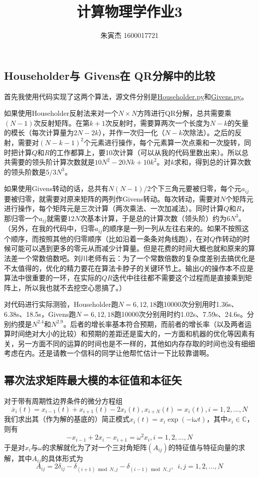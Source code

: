 \documentclass[UTF8,size=9.5]{ctexart}
\title{计算物理学作业3}
\author{朱寅杰 1600017721}
\date{}
\begin{document}
\maketitle
\setcounter{section}{3}
\subsection{Householder与 Givens在 QR分解中的比较}
首先我使用代码实现了这两个算法，源文件分别是\href{./Householder.py}{Householder.py}和\href{./Givens.py}{Givens.py}。

如果使用Householder反射法来对一个$N\times N$方阵进行QR分解，总共需要乘$(N-1)$次反射矩阵。在第$k+1$次反射时，需要算两次一个长度为$N-k$的矢量的模长（每次计算量为$2N-2k$），并作一次归一化（$N-k$次除法）。之后的反射，需要对$(N-k-1)^2$个元素进行操作，每个元素算一次点乘和一次旋转，同时把计算$Q$和$R$的工作都算上，要10次计算（可以从我的代码里数出来）。所以总共需要的领头阶计算次数就是$10N^2-20Nk+10k^2$。对$k$求和，得到总的计算次数的领头阶数是$5/3N^3$。

如果使用Givens转动的话，总共有$N(N-1)/2$个下三角元要被归零，每个元$a_{ij}$要被归零，就需要对原来矩阵的两列作Givens转动。每次转动，需要对$N$个矩阵元进行操作，每个矩阵元是三次计算（两次乘法、一次加减法）。同时计算$Q$和$R$，那归零一个$a_{ij}$就需要$12N$次基本计算，于是总的计算次数（领头阶）约为$6N^3$。（另外，在我的代码中，归零$a_{ij}$的顺序是一列一列从左往右来的。如果不按照这个顺序，而按照其他的归零顺序（比如沿着一条条对角线跑），在对$Q$作转动的时候可能可以遇到更多的零元从而减少计算量。但是花费的时间大概也就和原来的算法差一个常数倍数吧。刘川老师有云：为了一个常数倍数的复杂度差别去搞优化是不太值得的，优化的精力要花在算法卡脖子的关键环节上。输出$Q$的操作本不应是算法中很重要的一环，在实际的$QR$迭代中往往都不需要这个过程而是直接乘到矩阵上，所以我也就不去挖空心思搞了。）

对代码进行实际测验，Householder跑$N=6,12,18$跑10000次分别用时1.36s、6.38s、18.5s，Givens跑$N=6,12,18$跑10000次分别用时约1.02s、7.59s、24.6s。分别约摸是$N^{2.4}$和$N^{2.9}$。后者的增长率基本符合预期，而前者的增长率（以及两者运算时间绝对大小的比较）和预期的差距还是蛮大的，一方面和机器的优化等因素有关，另一方面不同的运算的时间也是不一样的，其他如内存存取的时间也没有细细考虑在内。还是请教一个信科的同学让他帮忙估计一下比较靠谱啊。
\subsection{幂次法求矩阵最大模的本征值和本征矢}
对于带有周期性边界条件的微分方程组
\[\ddot{x_{i}}(t)=x_{i-1}(t)+x_{i+1}(t)-2x_{i}(t),x_{i+N}(t)=x_{i}(t),i=1,2,...,N\]
我们求出其（作为解的基底的）简正模式$x_i(t)=x_i\exp(-\mathrm{i}\omega t)$，其中$x_i\in \mathds{C}$，则有
\[-x_{i-1}+2x_i-x_{i+1}=\omega^2 x_i,i=1,2,...,N\]
于是对$x_i$与$\omega$的求解就化为了对一个三对角矩阵$(A_{ij})$的特征值与特征向量的求解，其中$A_{ij}$的具体形式为
\[A_{ij}=2\delta_{ij}-\delta_{(i+1)\bmod N,j}-\delta_{(i-1)\bmod N,j},\enspace i,j=1,2,...,N\]
\end{document}
